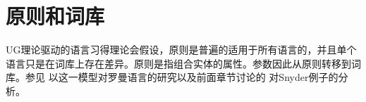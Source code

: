 
\section{原则和词库}

UG理论驱动的语言习得理论会假设，原则是普遍的适用于所有语言的，并且单个语言只是在词库上存在差异。原则是指组合实体的属性。参数因此从原则转移到词库\citep[]{Chomsky99a}。参见 \citet{MR2010a}以这一模型对罗曼语言的研究以及前面章节讨论的 \citet[]{SonS2008a}对Snyder例子的分析。

